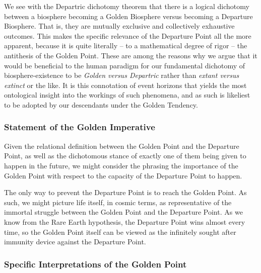 We see with the Departric dichotomy theorem that there is a logical dichotomy between a biosphere becoming a Golden Biosphere versus becoming a Departure Biosphere. That is, they are mutually exclusive and collectively exhaustive outcomes. This makes the specific relevance of the Departure Point all the more apparent, because it is quite literally -- to a mathematical degree of rigor -- the antithesis of the Golden Point. These are among the reasons why we argue that it would be beneficial to the human paradigm for our fundamental dichotomy of biosphere-existence to be \textit{Golden versus Departric} rather than \textit{extant versus extinct} or the like. It is this connotation of event horizons that yields the most ontological insight into the workings of such phenomena, and as such is likeliest to be adopted by our descendants under the Golden Tendency. 

\subsubsection{Statement of the Golden Imperative}

Given the relational definition between the Golden Point and the Departure Point, as well as the dichotomous stance of exactly one of them being given to happen in the future, we might consider the phrasing the importance of the Golden Point with respect to the capacity of the Departure Point to happen.
\begin{prince}
    The only way to prevent the Departure Point is to reach the Golden Point. As such, we might picture life itself, in cosmic terms, as representative of the immortal struggle between the Golden Point and the Departure Point. As we know from the Rare Earth hypothesis, the Departure Point wins almost every time, so the Golden Point itself can be viewed as the infinitely sought after immunity device against the Departure Point. 
\end{prince}

\subsubsection{Specific Interpretations of the Golden Point}

